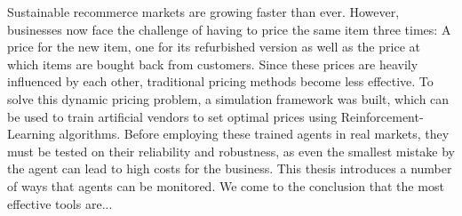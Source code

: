 Sustainable recommerce markets are growing faster than ever. However, businesses now face the challenge of having to price the same item three times: A price for the new item, one for its refurbished version as well as the price at which items are bought back from customers. Since these prices are heavily influenced by each other, traditional pricing methods become less effective. To solve this dynamic pricing problem, a simulation framework was built, which can be used to train artificial vendors to set optimal prices using Reinforcement-Learning algorithms.
Before employing these trained agents in real markets, they must be tested on their reliability and robustness, as even the smallest mistake by the agent can lead to high costs for the business. This thesis introduces a number of ways that agents can be monitored. We come to the conclusion that the most effective tools are...  